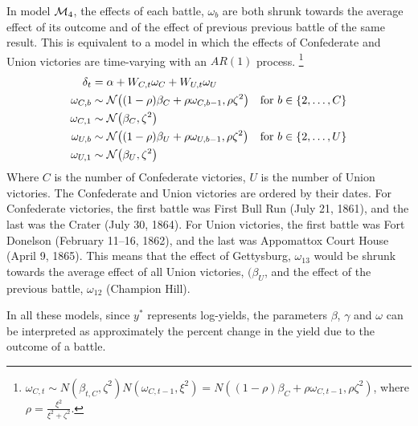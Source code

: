 In model $\mathcal{M}_{\text{4}}$, the effects of each battle, $\omega_{b}$ are both shrunk towards the average effect of its outcome and of the effect of previous previous battle of the same result.
This is equivalent to a model in which the effects of Confederate and Union victories are time-varying with an $AR(1)$ process.%
\footnote{
   $\omega_{C,t} \sim N(\beta_{t,C}, \zeta^{2}) N(\omega_{C,t-1}, \xi^{2}) = N((1 - \rho) \beta_{C} + \rho \omega_{C,t-1}, \rho \zeta^{2})$, where $\rho = \frac{\xi^{2}}{\xi^{2} + \zeta^{2}}$.
}
\begin{align}
  \label{bonds:eq:11}
  \delta_{t} &= \alpha + W_{C,t} \omega_{C} + W_{U,t} \omega_{U} \\
  \omega_{C,b} & \sim \mathcal{N}\mathopen{}\left((1 - \rho) \beta_{C} + \rho \omega_{C,b-1}, \rho \zeta^{2}\right)\mathclose{} & \text{for $b \in \{2, \dots, C\}$} \\
  \omega_{C,1} & \sim \mathcal{N}\mathopen{}\left( \beta_{C}, \zeta^{2}\right)\mathclose{} \\
  \omega_{U,b} & \sim \mathcal{N}\mathopen{}\left((1 - \rho) \beta_{U} + \rho \omega_{U,b-1}, \rho \zeta^{2}\right)\mathclose{} & \text{for $b \in \{2, \dots, U \}$} \\
  \omega_{U,1} & \sim \mathcal{N}\mathopen{}\left( \beta_{U}, \zeta^{2}\right)\mathclose{}
\end{align}
Where $C$ is the number of Confederate victories, $U$ is the number of Union victories.
The Confederate and Union victories are ordered by their dates.
For Confederate victories, the first battle was First Bull Run (July 21, 1861), and the last was the Crater (July 30, 1864).
For Union victories, the first battle was Fort Donelson (February 11--16, 1862), and the last was Appomattox Court House (April 9, 1865).
This means that the effect of Gettysburg, $\omega_{13}$ would be shrunk towards the average effect of all Union victories, $(\beta_{U}$, and the effect of the previous battle, $\omega_{12}$ (Champion Hill).%

In all these models, since $y^{*}$ represents log-yields, the parameters $\beta$, $\gamma$ and $\omega$ can be interpreted as approximately the percent change in the yield due to the outcome of a battle.

